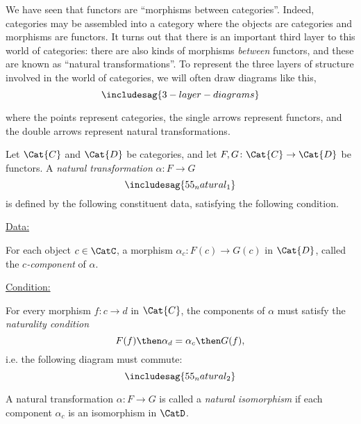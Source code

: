 
We have seen that functors are ``morphisms between categories''. Indeed, categories may be assembled into a category \CatC where the objects are categories and morphisms are functors. It turns out that there is an important third layer to this world of categories: there are also kinds of morphisms \emph{between} functors, and these are known as ``natural transformations''. To represent the three layers of structure involved in the world of categories, we will often draw diagrams like this, 
\begin{equation}
\includesag{3-layer-diagrams}
\end{equation}


where the points represent categories, the single arrows represent functors, and the double arrows represent natural transformations. 


\begin{ctdefinition}
Let $\Cat{C}$ and $\Cat{D}$ be categories, and let $F,G\colon \Cat{C}\to \Cat{D}$ be functors. A \emph{natural transformation} $\alpha\colon F\to G$ 
\begin{equation}
\includesag{55_natural_1}
\end{equation}
is defined by the following constituent data, satisfying the following condition. 

\underline{Data:} 
\begin{compactenum}
\item For each object $c\in \CatC$, a morphism $\alpha_c\colon F(c)\to G(c)$ in $\Cat{D}$, called the $c$\emph{-component} of $\alpha$. 
\end{compactenum}
\underline{Condition:} 
\begin{compactenum}
\item For every morphism $f\colon c\to d$ in $\Cat{C}$, the components of $\alpha$ must satisfy the \emph{naturality condition}
\begin{equation}
    F(f)\then \alpha_d = \alpha_c\then G(f),
\end{equation}
i.e. the following diagram must commute:
\begin{equation}
\includesag{55_natural_2}
\end{equation}
\end{compactenum}
\end{ctdefinition}

\begin{ctdefinition}
\label{def:nat_iso}
A natural transformation $\alpha\colon F\to G$ is called a \emph{natural isomorphism} if each component $\alpha_c$ is an isomorphism in $\CatD$.
\end{ctdefinition}

